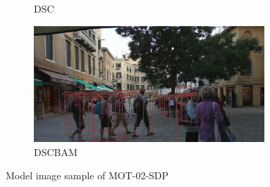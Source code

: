 \begin{figure}[!htbp]
\begin{subfigure}{.25\textwidth}
  \caption{DSC}
  \label{fig:dscMOT-02}
\end{subfigure}%
\begin{subfigure}{.25\textwidth}
  \centering
  \includegraphics[width=0.95\textwidth]{images/DSCBAM_MOT-02.png}
  \caption{DSCBAM}
  \label{fig:dscbamMOT-02}
\end{subfigure}
\caption{Model image sample of MOT-02-SDP}
\label{fig:MOT-02}
\end{figure}

